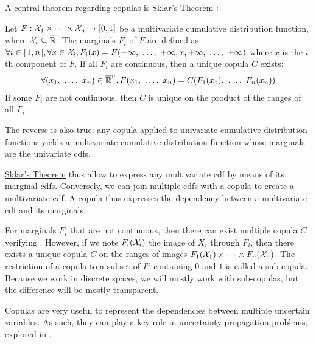 A central theorem regarding copulas is \hyperref[theorem:sklar]{Sklar's Theorem} \cite{sklar_fonctions_1959}:
\begin{theorem}\label{theorem:sklar}
    Let $F:\mathcal{X}_1\times\dots\times\mathcal{X}_n\rightarrow[0,1]$ be a multivariate cumulative distribution function, where $\mathcal{X}_i\subseteq\overline{\mathbb{R}}$. The marginals $F_i$ of $F$ are defined as $\forall i\in[\![ 1,n]\!] , \forall x\in\mathcal{X}_i, F_i(x) = F( +\infty, ~\ldots, ~  +\infty, x,  +\infty, ~\ldots, ~ +\infty)$ where $x$ is the $i$-th component of $F$. If all $F_i$ are continuous, then a unique copula $C$ exists:
    \begin{align}
        \forall (x_1, ~\ldots, ~ x_n)\in \overline{\mathbb{R}}^n, F(x_1, ~\ldots, ~ x_n)=C(F_1(x_1), ~\ldots, ~ F_n(x_n))\label{eq:sklar_equality}
    \end{align}
    If some $F_i$ are not continuous, then $C$ is unique on the product of the ranges of all $F_i$.
    
    The reverse is also true: any copula applied to univariate cumulative distribution functions yields a multivariate cumulative distribution function whose marginals are the univariate \acrshort{cdf}s.
\end{theorem}

\hyperref[theorem:sklar]{Sklar's Theorem} thus allow to express any multivariate \acrshort{cdf} by means of its marginal \acrshort{cdf}s. Conversely, we can join multiple \acrshort{cdf}s with a copula to create a multivariate \acrshort{cdf}. A copula thus expresses the dependency between a multivariate \acrshort{cdf} and its marginals.
 
\begin{remark}
    For marginals $F_i$ that are not continuous, then there can exist multiple copula $C$ verifying . However, if we note $F_i(\mathcal{X}_i)$ the image of $X_i$ through $F_i$, then there exists a unique copula $C$ on the ranges of images $F_1(\mathcal{X}_1)\times\dots\times F_n(\mathcal{X}_n)$. The restriction of a copula to a subset of $I^n$ containing $0$ and $1$ is called a sub-copula. Because we work in discrete spaces, we will mostly work with sub-copulas, but the difference will be mostly transparent.
\end{remark}

Copulas are very useful to represent the dependencies between multiple uncertain variables. As such, they can play a key role in uncertainty propagation problems, explored in .

